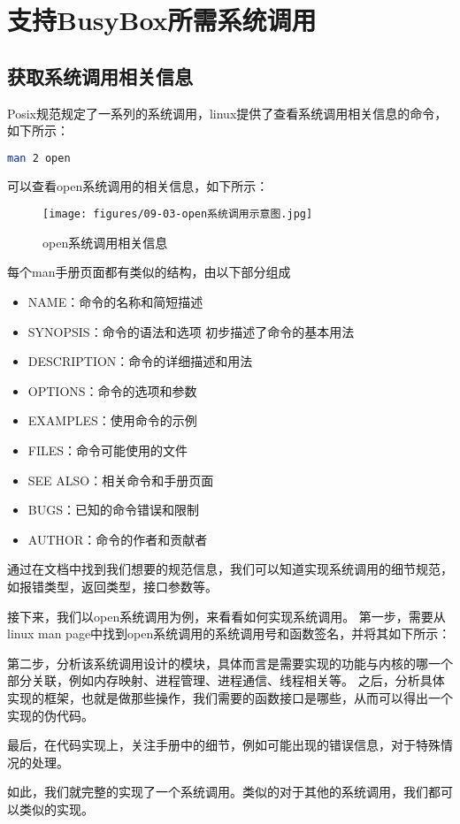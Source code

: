 \section{支持BusyBox所需系统调用}
\subsection{获取系统调用相关信息}
Posix规范规定了一系列的系统调用，linux提供了查看系统调用相关信息的命令，如下所示：
\begin{lstlisting}[language=bash]
    man 2 open 
\end{lstlisting}
可以查看open系统调用的相关信息，如下所示：
\begin{figure}[H]
  \centering
  \texttt{[image: figures/09-03-open系统调用示意图.jpg]}
  \caption{open系统调用相关信息}
  \label{fig:open_syscall}
\end{figure}
每个man手册页面都有类似的结构，由以下部分组成
\begin{itemize}
    \item NAME：命令的名称和简短描述
    \item SYNOPSIS：命令的语法和选项 初步描述了命令的基本用法
    \item DESCRIPTION：命令的详细描述和用法
    \item OPTIONS：命令的选项和参数
    \item EXAMPLES：使用命令的示例
    \item FILES：命令可能使用的文件
    \item SEE ALSO：相关命令和手册页面
    \item BUGS：已知的命令错误和限制
    \item AUTHOR：命令的作者和贡献者
\end{itemize}
通过在文档中找到我们想要的规范信息，我们可以知道实现系统调用的细节规范，如报错类型，返回类型，接口参数等。

接下来，我们以open系统调用为例，来看看如何实现系统调用。
第一步，需要从linux man page中找到open系统调用的系统调用号和函数签名，并将其如下所示：

第二步，分析该系统调用设计的模块，具体而言是需要实现的功能与内核的哪一个部分关联，例如内存映射、进程管理、进程通信、线程相关等。
之后，分析具体实现的框架，也就是做那些操作，我们需要的函数接口是哪些，从而可以得出一个实现的伪代码。

最后，在代码实现上，关注手册中的细节，例如可能出现的错误信息，对于特殊情况的处理。

如此，我们就完整的实现了一个系统调用。类似的对于其他的系统调用，我们都可以类似的实现。